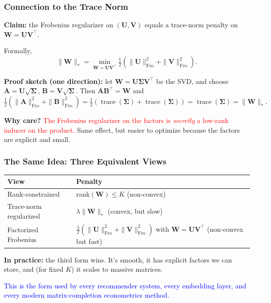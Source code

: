 \documentclass[notes,11pt, aspectratio=169]{beamer}
\DeclareMathOperator{\trace}{trace}
\newcommand{\vA}{\mathbf{A}}
\newcommand{\vB}{\mathbf{B}}
\newcommand{\vU}{\mathbf{U}}
\newcommand{\vV}{\mathbf{V}}
\newcommand{\vW}{\mathbf{W}}
\newcommand{\vSigma}{\boldsymbol{\Sigma}}
\newcommand{\Frob}{\mathrm{Fro}}
\begin{document}
\begin{frame}
\frametitle{Connection to the Trace Norm}

\textbf{Claim:} the Frobenius regularizer on $(\vU, \vV)$ equals a trace-norm penalty on $\vW = \vU \vV^\top$.

\vspace{6pt}
Formally,
\[
    \|\vW\|_* = \min_{\vW = \vU \vV^\top} \tfrac{1}{2}\!\left(\|\vU\|_\Frob^2 + \|\vV\|_\Frob^2\right).
\]

\vspace{8pt}
\textbf{Proof sketch (one direction):} let $\vW = \vU \vSigma \vV^\top$ be the SVD, and choose $\vA = \vU \sqrt{\vSigma}$, $\vB = \vV \sqrt{\vSigma}$. Then $\vA \vB^\top = \vW$ and
\[
    \tfrac{1}{2}(\|\vA\|_\Frob^2 + \|\vB\|_\Frob^2) = \tfrac{1}{2}(\trace(\vSigma) + \trace(\vSigma)) = \trace(\vSigma) = \|\vW\|_*.
\]

\vspace{6pt}
\textbf{Why care?} \textcolor{red}{The Frobenius regularizer on the factors is \emph{secretly} a low-rank inducer on the product.} Same effect, but easier to optimize because the factors are explicit and small.
\end{frame}

\begin{frame}
\frametitle{The Same Idea: Three Equivalent Views}

\begin{center}
\begin{tabular}{p{4.5cm} p{8cm}}
\toprule
\textbf{View} & \textbf{Penalty} \\
\midrule
Rank-constrained & rank$(\vW) \leq K$ (non-convex) \\[4pt]
Trace-norm regularized & $\lambda \|\vW\|_*$ (convex, but slow) \\[4pt]
Factorized Frobenius & $\frac{\lambda}{2}(\|\vU\|_\Frob^2 + \|\vV\|_\Frob^2)$ with $\vW = \vU \vV^\top$ (non-convex but fast) \\
\bottomrule
\end{tabular}
\end{center}

\vspace{12pt}
\textbf{In practice:} the third form wins. It's smooth, it has explicit factors we can store, and (for fixed $K$) it scales to massive matrices.

\vspace{6pt}
\textcolor{blue}{This is the form used by every recommender system, every embedding layer, and every modern matrix-completion econometrics method.}
\end{frame}
\end{document}
